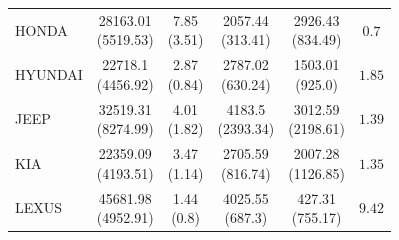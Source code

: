 \begin{tabular}{lccccc}
HONDA & \makecell{28163.01 \\ (5519.53)\\[0.25em]} & \makecell{7.85 \\ (3.51)\\[0.25em]} & \makecell{2057.44 \\ (313.41)\\[0.25em]} & \makecell{2926.43 \\ (834.49)\\[0.25em]} & $0.7$ \\
HYUNDAI & \makecell{22718.1 \\ (4456.92)\\[0.25em]} & \makecell{2.87 \\ (0.84)\\[0.25em]} & \makecell{2787.02 \\ (630.24)\\[0.25em]} & \makecell{1503.01 \\ (925.0)\\[0.25em]} & $1.85$ \\
JEEP & \makecell{32519.31 \\ (8274.99)\\[0.25em]} & \makecell{4.01 \\ (1.82)\\[0.25em]} & \makecell{4183.5 \\ (2393.34)\\[0.25em]} & \makecell{3012.59 \\ (2198.61)\\[0.25em]} & $1.39$ \\
KIA & \makecell{22359.09 \\ (4193.51)\\[0.25em]} & \makecell{3.47 \\ (1.14)\\[0.25em]} & \makecell{2705.59 \\ (816.74)\\[0.25em]} & \makecell{2007.28 \\ (1126.85)\\[0.25em]} & $1.35$ \\
LEXUS & \makecell{45681.98 \\ (4952.91)\\[0.25em]} & \makecell{1.44 \\ (0.8)\\[0.25em]} & \makecell{4025.55 \\ (687.3)\\[0.25em]} & \makecell{427.31 \\ (755.17)\\[0.25em]} & $9.42$ \\

\end{tabular}
